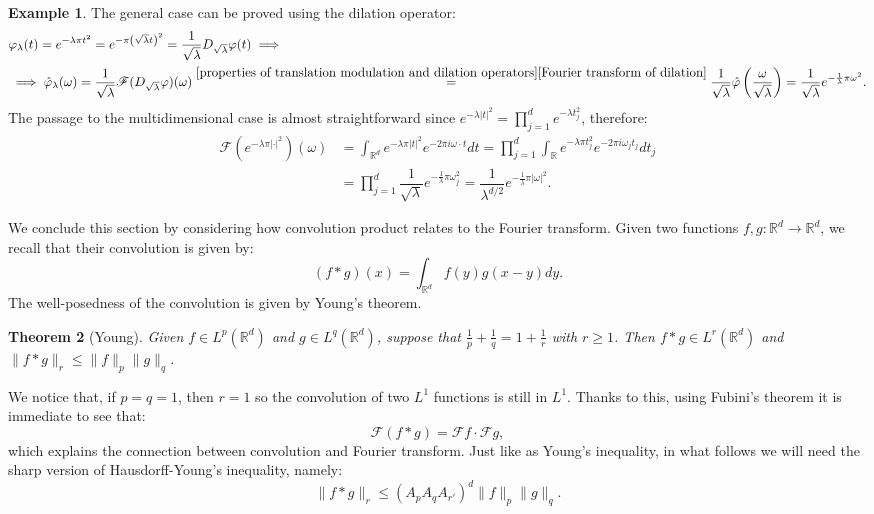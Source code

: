 \documentclass[corpo=11pt, stile=classica, tipotesi=custom,
greek, evenboxes, english]{toptesi}
\numberwithin{equation}{chapter}
\newtheorem{teo}{Theorem}[chapter] %
\theoremstyle{definition}
\newtheorem{es}[teo]{Example}
\theoremstyle{remark}
\newcommand{\R}{\mathbb{R}} %
\newcommand{\F}{\mathscr{F}} %
\begin{document}
\begin{es}
	The general case can be proved using the dilation operator:
	\begin{align*}
		&\varphi_{\lambda}(t) = e^{-\lambda \pi t^2} = e^{-\pi \left(\sqrt{\lambda} t\right)^2} = \dfrac{1}{\sqrt{\lambda}} D_{\sqrt{\lambda}}\varphi(t) \implies\\
		                     &\implies \hat{\varphi}_{\lambda}(\omega) = \dfrac{1}{\sqrt{\lambda}} \F ( D_{\sqrt{\lambda}}\varphi )(\omega) \overset{\ref{properties of translation modulation and dilation operators}\ref{Fourier transform of dilation}}{=} \dfrac{1}{\sqrt{\lambda}} \hat{\varphi}\left(\frac{\omega}{\sqrt{\lambda}}\right) = \dfrac{1}{\sqrt{\lambda}} e^{-\frac{1}{\lambda}\pi\omega^2}.
	\end{align*}
	The passage to the multidimensional case is almost straightforward since $e^{-\lambda|t|^2} = \prod_{j=1}^d e^{-\lambda t_j^2}$, therefore:
	\begin{align*}
		\F(e^{-\lambda\pi|\cdot|^2})(\omega) &= \int_{\R^d} e^{-\lambda \pi |t|^2} e^{-2\pi i \omega \cdot t}dt = \prod_{j=1}^d \int_{\R} e^{-\lambda \pi t_j^2} e^{-2\pi i \omega_j t_j} dt_j \\
										  &= \prod_{j=1}^d \dfrac{1}{\sqrt{\lambda}}e^{-\frac{1}{\lambda}\pi \omega_j^2} = \dfrac{1}{\lambda^{d/2}} e^{-\frac{1}{\lambda}\pi|\omega|^2}.
	\end{align*}
\end{es}

We conclude this section by considering how convolution product relates to the Fourier transform. Given two functions $f,g : \R^d \rightarrow \R^d$, we recall that their convolution is given by:
\begin{equation*}\label{convolution formula}
	(f * g) (x) = \int_{\R^d} f(y) g(x - y)dy.
\end{equation*}
The well-posedness of the convolution is given by Young's theorem.
\begin{teo}[Young]\label{Young theorem}
	Given $f \in L^p(\R^d)$ and $g \in L^q(\R^d)$, suppose that $\frac{1}{p}+\frac{1}{q}=1+\frac{1}{r}$ with $r \geq 1$. Then $f * g \in L^r(\R^d)$ and $\|f * g\|_r \leq \|f\|_p \|g\|_q$.
\end{teo}
We notice that, if $p=q=1$, then $r=1$ so the convolution of two $L^1$ functions is still in $L^1$. Thanks to this, using Fubini's theorem it is immediate to see that:
\begin{equation*}\label{Fourier transform of convolution}
	\F(f * g) = \F f \cdot \F g,
\end{equation*}
which explains the connection between convolution and Fourier transform.
Just like as Young's inequality, in what follows we will need the sharp version of  Hausdorff-Young's inequality, namely:
\begin{equation}\label{Young inequality sharp}
	\|f * g\|_r \leq (A_p A_q A_{r'})^d \|f\|_p \|g\|_q.
\end{equation}
\end{document}

